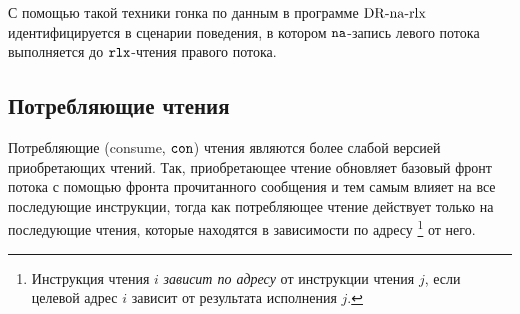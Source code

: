 С помощью такой техники гонка по данным в программе ${\rm DR\text{-}na\text{-}rlx}$ идентифицируется в сценарии
поведения, в котором $\mathtt{na}$-запись левого потока выполняется до $\mathtt{rlx}$-чтения правого потока.

\subsection{Потребляющие чтения}
Потребляющие (consume, ${\mathtt{con}}$) чтения являются более слабой версией приобретающих чтений.
Так, приобретающее чтение обновляет базовый фронт потока с помощью фронта прочитанного сообщения
и тем самым влияет на все последующие инструкции, тогда как потребляющее чтение действует только
на последующие чтения, которые находятся в зависимости по адресу%
\footnote{Инструкция чтения $i$ \emph{зависит по адресу} от инструкции чтения $j$, если
целевой адрес $i$ зависит от результата исполнения $j$.}
от него.

